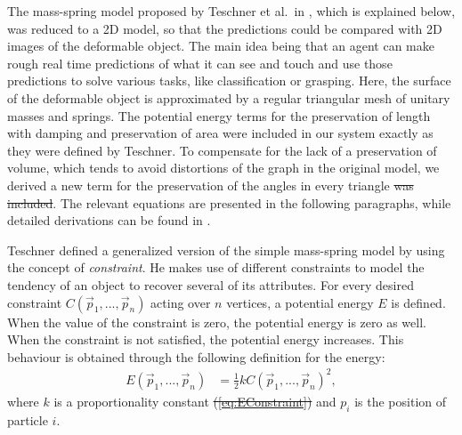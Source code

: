\documentclass[journal]{IEEEtran}
\newcommand{\eref}[1]{(\ref{#1})}
\newcommand{\comment}[1]{{\color{red} #1}}
\begin{document}
The mass-spring model proposed by Teschner et al.\ in \cite{Teschner2004}, which is explained below, was reduced to a 2D model, so that the predictions could be compared with 2D images of the deformable object.  The main idea being that an agent can make rough real time predictions of what it can see and touch and use those predictions to solve various tasks, like classification or grasping.  Here, the surface of the deformable object is approximated by a regular triangular mesh of unitary masses and springs.  The potential energy terms for the preservation of length with damping and preservation of area were included in our system \comment{exactly as they were defined by Teschner}.  To compensate for the lack of a preservation of volume, which tends to avoid distortions of the graph \comment{in the original model}, \comment{we derived } a new term for the preservation of the angles \comment{in every triangle} \sout{was included}.  The relevant equations are presented in the following paragraphs, while detailed derivations can be found in \cite{Arriola2013thesis}.

\comment{Teschner defined a generalized version of the simple mass-spring model by using the concept of \emph{constraint}.  He makes use of different constraints to model the tendency of an object to recover several of its attributes.} For every desired constraint $C(\vec{p}_1,...,\vec{p}_{n})$ acting over $n$ vertices, a potential energy $E$ is defined.  When the value of the constraint is zero, the potential energy is zero as well.  When the constraint is not satisfied, the potential energy increases.  This behaviour is obtained through the following definition for the energy:
\begin{align}
 E(\vec{p}_1,...,\vec{p}_{n}) & = \frac{1}{2}kC(\vec{p}_1,...,\vec{p}_{n})^2, \label{eq:EConstraint}
\end{align}
where $k$ is a proportionality constant \comment{\sout{\eref{eq:EConstraint}}} and $p_i$ is the position of particle $i$.
\end{document}
